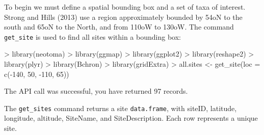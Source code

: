 \documentclass{article}
\begin{document}
To begin we must define a spatial bounding box and a set of taxa of interest.  Strong and Hills (2013) use a region approximately bounded by 54oN to the south and 65oN to the North, and from 110oW to 130oW.  The command \texttt{get\_site} is used to find all sites within a bounding box:

\begin{Schunk}
\begin{Sinput}
> library(neotoma)
> library(ggmap)
> library(ggplot2)
> library(reshape2)
> library(plyr)
> library(Bchron)
> library(gridExtra)
> all.sites <- get_site(loc = c(-140, 50, -110, 65))
\end{Sinput}
\begin{Soutput}
The API call was successful, you have returned  97 records.
\end{Soutput}
\end{Schunk}

The \texttt{get_sites} command returns a site \texttt{data.frame}, with siteID, latitude, longitude, altitude, SiteName, and SiteDescription.  Each row represents a unique site. 
\end{document}
